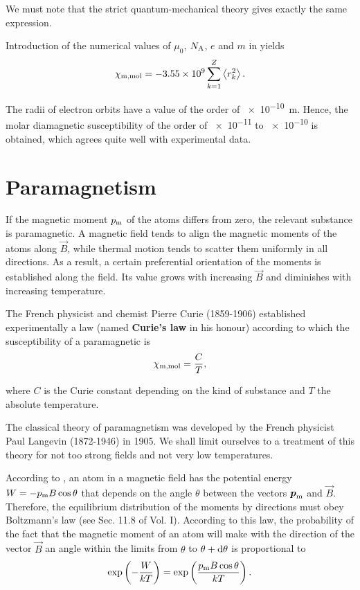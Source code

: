 \noindent
We must note that the strict quantum-mechanical theory gives exactly the same expression.

Introduction of the numerical values of $\mu_0$, $N_{\text{A}}$, $e$ and $m$ in  yields
\begin{equation*}
    \chi_{\text{m,mol}} = -\num{3.55e9} \sum_{k=1}^Z \left\langle r^2_k \right\rangle.
\end{equation*}

\noindent
The radii of electron orbits have a value of the order of \SI{e-10}{\metre}.
Hence, the molar diamagnetic susceptibility of the order of \num{e-11} to \num{e-10} is obtained, which agrees quite well with experimental data.

\section{Paramagnetism}\label{sec:7_8}

If the magnetic moment $p_{\text{m}}$ of the atoms differs from zero, the relevant substance is paramagnetic.
A magnetic field tends to align the magnetic moments of the atoms along $\vec{B}$, while thermal motion tends to scatter them uniformly in all directions.
As a result, a certain preferential orientation of the moments is established along the field.
Its value grows with increasing $\vec{B}$ and diminishes with increasing temperature.

The French physicist and chemist Pierre Curie (1859-1906) established experimentally a law (named \textbf{Curie's law} in his honour) according to which the susceptibility of a paramagnetic is
\begin{equation}\label{eq:7_52}
    \chi_{\text{m,mol}} = \frac{C}{T},
\end{equation}

\noindent
where $C$ is the Curie constant depending on the kind of substance and $T$ the absolute temperature.

The classical theory of paramagnetism was developed by the French physicist Paul Langevin (1872-1946) in 1905.
We shall limit ourselves to a treatment of this theory for not too strong fields and not very low temperatures.

According to , an atom in a magnetic field has the potential energy $W=-p_{\text{m}}B\cos\theta$ that depends on the angle $\theta$ between the vectors $\boldsymbol{p}_{\text{m}}$ and $\vec{B}$.
Therefore, the equilibrium distribution of the moments by directions must obey Boltzmann's law (see
Sec. 11.8 of Vol. I).
According to this law, the probability of the fact that the magnetic moment of an atom will make with the direction of the vector $\vec{B}$ an angle within the limits from $\theta$ to $\theta+\mathrm{d}\theta$ is proportional to
\begin{equation*}
    \exp\left(-\frac{W}{kT}\right) = \exp\left(\frac{p_{\text{m}} B \cos\theta}{kT}\right).
\end{equation*}

